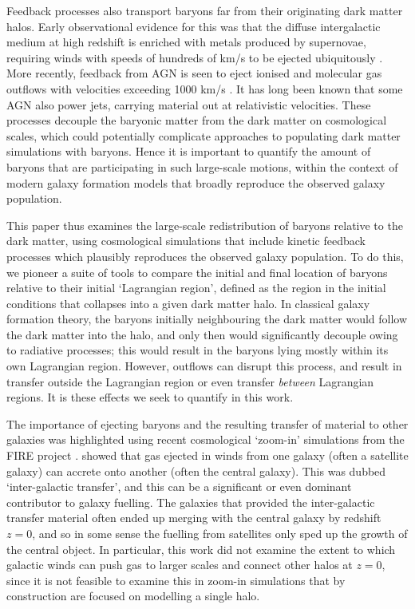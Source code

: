 Feedback processes also transport baryons far
from their originating dark matter halos. Early observational evidence for
this was that the diffuse intergalactic medium at high redshift is enriched
with metals produced by supernovae, requiring winds with speeds of hundreds
of km/s to be ejected ubiquitously \citep[e.g.][]{Aguirre2001, Springel2003,
 Oppenheimer2006}. More recently, feedback from AGN is seen to eject ionised
and molecular gas outflows with velocities exceeding 1000 km/s
\citep[e.g.][]{Sturm2001, Maiolino2012}. It has long been known that some AGN
also power jets, carrying material out at relativistic velocities. These
processes decouple the baryonic matter from the dark matter on cosmological
scales, which could potentially complicate approaches to populating dark
matter simulations with baryons. Hence it is important to quantify the amount
of baryons that are participating in such large-scale motions, within the
context of modern galaxy formation models that broadly reproduce the observed
galaxy population.

This paper thus examines the large-scale redistribution of baryons relative
to the dark matter, using cosmological simulations that include kinetic
feedback processes which plausibly reproduces the observed galaxy population.
To do this, we pioneer a suite of tools to compare the initial and final
location of baryons relative to their initial `Lagrangian region', defined as
the region in the initial conditions that collapses into a given dark matter
halo. In classical galaxy formation theory, the baryons initially neighbouring
the dark matter would follow the dark matter into the halo, and only then
would significantly decouple owing to radiative processes; this would result
in the baryons lying mostly within its own Lagrangian region. However,
outflows can disrupt this process, and result in transfer outside the
Lagrangian region or even transfer \emph{between} Lagrangian regions. It is
these effects we seek to quantify in this work.

The importance of ejecting baryons and the resulting transfer of material to
other galaxies was highlighted using recent cosmological `zoom-in'
simulations from the FIRE project \citep{Hopkins2014,Hopkins2018}.
\citet{AnglesAlcazar2017} showed that gas ejected in winds from one galaxy
(often a satellite galaxy) can accrete onto another (often the central
galaxy). This was dubbed `inter-galactic transfer', and this can be a
significant or even dominant contributor to galaxy fuelling. The galaxies
that provided the inter-galactic transfer material often ended up merging
with the central galaxy by redshift $z=0$, and so in some sense the fuelling
from satellites only sped up the growth of the central object. In particular,
this work did not examine the extent to which galactic winds can push gas to
larger scales and connect other halos at $z=0$, since it is not feasible to
examine this in zoom-in simulations that by construction are focused on
modelling a single halo.

